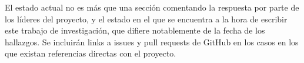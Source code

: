 El estado actual no es más que una sección comentando la respuesta por parte de los líderes del proyecto, y el estado en el que se encuentra a la hora de escribir este trabajo de investigación, que difiere notablemente de la fecha de los hallazgos. Se incluirán links a issues y pull requests de GitHub en los casos en los que existan referencias directas con el proyecto.
